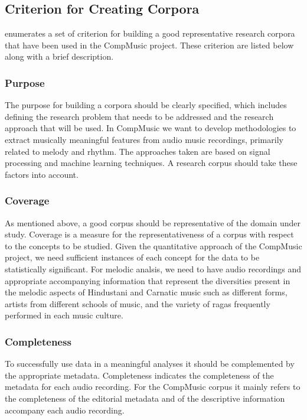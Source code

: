\subsection{Criterion for Creating Corpora}
\label{sec:corpus_criterion_for_corpora}

\cite{serra:14:corpus} enumerates a set of criterion for building a good representative research corpora that have been used in the CompMusic project. These criterion are listed below along with a brief description.

\subsubsection{Purpose}

The purpose for building a corpora should be clearly specified, which includes defining the research problem that needs to be addressed and the research approach that will be used. In CompMusic we want to develop methodologies to extract musically meaningful features from audio music recordings, primarily related to melody and rhythm. The approaches taken are based on signal processing and machine learning techniques. A research corpus should take these factors into account.

\subsubsection{Coverage}

As mentioned above, a good corpus should be representative of the domain under study. Coverage is a measure for the representativeness of a corpus with respect to the concepts to be studied. Given the quantitative approach of the CompMusic project, we need sufficient instances of each concept for the data to be statistically significant. For melodic analsis, we need to have audio recordings and appropriate accompanying information that represent the diversities present in the melodic aspects of Hindustani and Carnatic music such as different forms, artists from different schools of music, and the variety of \glspl{raga} frequently performed in each music culture. 

\subsubsection{Completeness}

To successfully use data in a meaningful analyses it should be complemented by the appropriate metadata. Completeness indicates the completeness of the metadata for each audio recording. For the CompMusic corpus it mainly refers to the completeness of the editorial metadata and of the descriptive information accompany each audio recording. 

